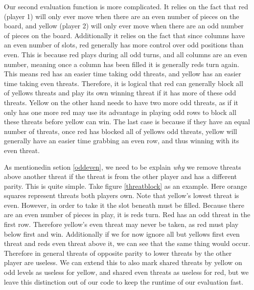 \documentclass{article}
\begin{document}
Our second evaluation function is more complicated. It relies on the fact that red (player 1) will only ever move when there are an even number of pieces on the board, and yellow (player 2) will only ever move when there are an odd number of pieces on the board. Additionally it relies on the fact that since columns have an even number of slots, red generally has more control over odd positions than even. This is because red plays during all odd turns, and all columns are an even number, meaning once a column has been filled it is generally reds turn again. This means red has an easier time taking odd threats, and yellow has an easier time taking even threats. Therefore, it is logical that red can generally block all of yellows threats and play its own winning threat if it has more of these odd threats. Yellow on the other hand needs to have two more odd threats, as if it only has one more red may use its advantage in playing odd rows to block all these threats before yellow can win. The last case is because if they have an equal number of threats, once red has blocked all of yellows odd threats, yellow will generally have an easier time grabbing an even row, and thus winning with its even threat.
		
As mentionedin setion \ref{oddeven}, we need to be explain \emph{why} we remove threats above another threat if the threat is from the other player and has a different parity. This is quite simple. Take figure \ref{threatblock} as an example. Here orange squares represent threats both players own. Note that yellow's lowest threat is even. However, in order to take it the slot beneath must be filled. Because there are an even number of pieces in play, it is reds turn. Red has an odd threat in the first row. Therefore yellow's even threat may never be taken, as red must play below first and win. Additionally if we for now ignore all but yellows first even threat and reds even threat above it, we can see that the same thing would occur. Therefore in general threats of opposite parity to lower threats by the other player are useless. We can extend this to also mark shared threats by yellow on odd levels as useless for yellow, and shared even threats as useless for red, but we leave this distinction out of our code to keep the runtime of our evaluation fast.
		
\end{document}
